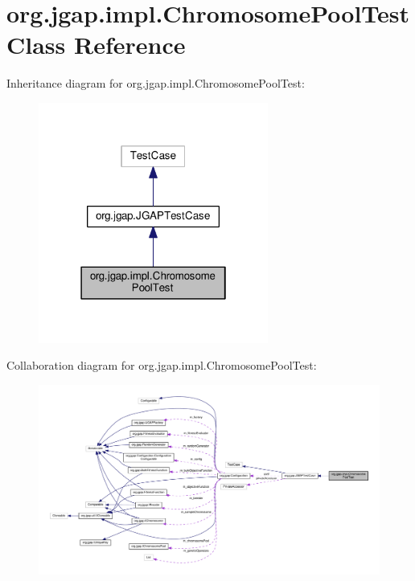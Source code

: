 \hypertarget{classorg_1_1jgap_1_1impl_1_1_chromosome_pool_test}{\section{org.\-jgap.\-impl.\-Chromosome\-Pool\-Test Class Reference}
\label{classorg_1_1jgap_1_1impl_1_1_chromosome_pool_test}
}


Inheritance diagram for org.\-jgap.\-impl.\-Chromosome\-Pool\-Test\-:
\nopagebreak
\begin{figure}[H]
\begin{center}
\leavevmode
\includegraphics[width=214pt]{classorg_1_1jgap_1_1impl_1_1_chromosome_pool_test__inherit__graph}
\end{center}
\end{figure}


Collaboration diagram for org.\-jgap.\-impl.\-Chromosome\-Pool\-Test\-:
\nopagebreak
\begin{figure}[H]
\begin{center}
\leavevmode
\includegraphics[width=350pt]{classorg_1_1jgap_1_1impl_1_1_chromosome_pool_test__coll__graph}
\end{center}
\end{figure}
